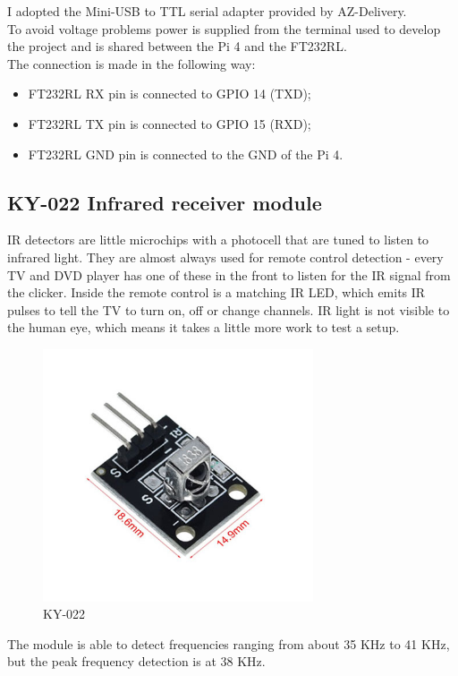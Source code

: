 \documentclass[a4paper, 12pt]{article}
\begin{document}
I adopted the Mini-USB to TTL serial adapter provided by AZ-Delivery\cite{FTDIAdapter}. \\
To avoid voltage problems power is supplied from the terminal used to develop the project and is shared between the Pi 4 and the FT232RL. \\ 
The connection is made in the following way:
\begin{itemize}
    \item FT232RL RX pin is connected to GPIO 14 (TXD);
    \item FT232RL TX pin is connected to GPIO 15 (RXD);
    \item FT232RL GND pin is connected to the GND of the Pi 4.
\end{itemize}

\subsection{KY-022 Infrared receiver module}

IR detectors\cite{ELEGOO} are little microchips with a photocell that are tuned to listen to infrared light. They are almost always used for remote control detection - every TV and DVD player has one of these in the front to listen for the IR signal from the clicker. Inside the remote control is a matching IR LED, which emits IR pulses to tell the TV to turn on, off or change channels. IR light is not visible to the human eye, which means it takes a little more work to test a setup.

\begin{figure}[h]
    \includegraphics[width=8cm]{ir_module}
    \centering
    \caption{KY-022}
\end{figure}

The module is able to detect frequencies ranging from about 35 KHz to 41 KHz, but the peak frequency detection is at 38 KHz.
\end{document}
